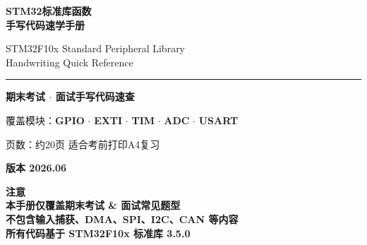 \documentclass[10pt,a4paper,oneside]{ctexart}
\begin{document}
\thispagestyle{empty}
\begin{center}
    \vspace*{3cm}

    {\huge\bfseries\color{mainblue} STM32标准库函数\\[4mm]手写代码速学手册}

    \vspace{10mm}

    {\Large STM32F10x Standard Peripheral Library\\[2mm] Handwriting Quick Reference}

    \vspace{6mm}

    \rule{0.7\textwidth}{1.5pt}

    \vspace{8mm}

    {\large\bfseries 期末考试 $\cdot$ 面试手写代码速查}

    \vspace{8mm}


    \vspace{12mm}

    {\large 覆盖模块：\textbf{GPIO} $\cdot$ \textbf{EXTI} $\cdot$ \textbf{TIM} $\cdot$ \textbf{ADC} $\cdot$ \textbf{USART}}

    \vspace{8mm}

    {\normalsize 页数：约20页 \quad 适合考前打印A4复习}

    \vspace{6mm}

    {\large\bfseries 版本 2026.06}

    \vspace{10mm}

    \begin{warnbox}
        \centering\bfseries
        {\Large 注意}\\[2mm]
        本手册仅覆盖期末考试 \& 面试常见题型\\
        不包含输入捕获、DMA、SPI、I2C、CAN 等内容\\
        所有代码基于 STM32F10x 标准库 3.5.0
    \end{warnbox}

\end{center}
\end{document}
